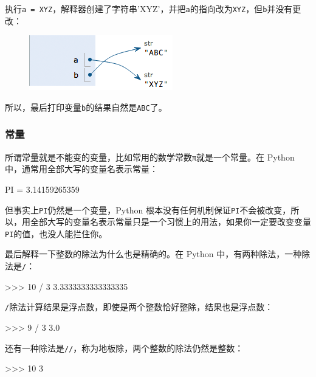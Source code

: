 执行\texttt{a\ =\ \textquotesingle{}XYZ\textquotesingle{}}，解释器创建了字符串'XYZ'，并把\texttt{a}的指向改为\texttt{\textquotesingle{}XYZ\textquotesingle{}}，但\texttt{b}并没有更改：

 
 \begin{figure}[htp]
	\centering
	\includegraphics[width=0.6\linewidth]{fig/9237921916377600.png}
\end{figure}


所以，最后打印变量\texttt{b}的结果自然是\texttt{\textquotesingle{}ABC\textquotesingle{}}了。

\hypertarget{ux5e38ux91cf}{%
\subsubsection{常量}\label{ux5e38ux91cf}}

所谓常量就是不能变的变量，比如常用的数学常数π就是一个常量。在 Python
中，通常用全部大写的变量名表示常量：

\begin{pythoncode}
PI = 3.14159265359
\end{pythoncode}

但事实上\texttt{PI}仍然是一个变量，Python
根本没有任何机制保证\texttt{PI}不会被改变，所以，用全部大写的变量名表示常量只是一个习惯上的用法，如果你一定要改变变量\texttt{PI}的值，也没人能拦住你。

最后解释一下整数的除法为什么也是精确的。在 Python
中，有两种除法，一种除法是\texttt{/}：

\begin{pythoncode}
>>> 10 / 3
3.3333333333333335
\end{pythoncode}

\texttt{/}除法计算结果是浮点数，即使是两个整数恰好整除，结果也是浮点数：

\begin{pythoncode}
>>> 9 / 3
3.0
\end{pythoncode}

还有一种除法是\texttt{//}，称为地板除，两个整数的除法仍然是整数：

\begin{pythoncode}
>>> 10 
3
\end{pythoncode}


